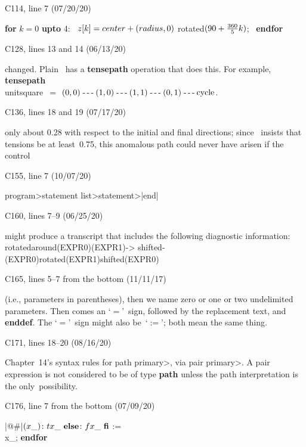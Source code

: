 \bugonpage C114, line 7 (07/20/20)

\ninepoint\indent
{\bf for} $k=0$ {\bf upto} 4: \ $z[k]=\\{center}+(\\{radius},0)$
  rotated$(90+{360\over5}k)$; \ {\bf endfor}

\bugonpage C128, lines 13 and 14 (06/13/20)

\ninepoint\noindent
changed. Plain \MF\ has a {\bf tensepath} operation
that does this. For example, {\bf tensepath}~\\{unitsquare}~$=$
$(0,0)\mathrel{\hbox{-\thinspace-\thinspace-\kern-.05em}}(1,0)\mathrel{\hbox{-\thinspace-\thinspace-\kern-.05em}}(1,1)\mathrel{\hbox{-\thinspace-\thinspace-\kern-.05em}}(0,1)\mathrel{\hbox{-\thinspace-\thinspace-\kern-.05em}}\hbox{\rm cycle}$.

\bugonpage C136, lines 18 and 19 (07/17/20)

\ninepoint\noindent
only
about 0.28 with respect to the initial and final directions; since \MF\ insists
that tensions be at least~0.75, this anomalous path could never have arisen
if the control\cutpar

\bugonpage C155, line 7 (10/07/20)

\tenpoint\indent
\<program>\is\<statement list>\<statement>\thinspace|end|

\bugonpage C160, lines 7--9 (06/25/20)

\ninepoint\noindent
might produce a transcript
that includes the following diagnostic information:
\begintt
rotatedaround(EXPR0)(EXPR1)->
 shifted-(EXPR0)rotated(EXPR1)shifted(EXPR0)
\endtt

\bugonpage C165, lines 5--7 from the bottom (11/11/17)

\ninepoint\noindent
(i.e., parameters in parentheses),
then we name zero or one or two undelimited parameters.
Then comes an `$=$'~sign,
followed by the replacement text, and {\bf enddef}. The `$=$'~sign might also
be~`$:=$'\thinspace; both mean the same thing.

\bugonpage C171, lines 18--20 (08/16/20)

\ninepoint\indent
Chapter~14's syntax rules for
\<path primary>, via \<pair primary>.
A pair expression is not considered to be
of type {\bf path} unless the path interpretation is the only~possibility.

\bugonpage C176, line 7 from the bottom (07/09/20)

\ninepoint\indent
{} |@#|$(\\{x\_})\colon\ \\{tx\_} \ \hbox{\bf else}\colon\
 \\{fx\_}\  \hbox{\bf fi}$
   :=\ \\{x\_}\thinspace; {\bf endfor}

